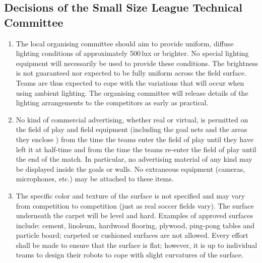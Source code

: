 \subsection*{Decisions of the Small Size League Technical Committee}
\begin{enumerate}
\item
The local organising committee should aim to provide uniform, diffuse lighting
conditions of approximately 500\,lux or brighter. No special lighting equipment
will necessarily be used to provide these conditions. The brightness is not
guaranteed nor expected to be fully uniform across the field surface. Teams are
thus expected to cope with the variations that will occur when using ambient
lighting. The organising committee will release details of the lighting
arrangements to the competitors as early as practical.

\item
No kind of commercial advertising, whether real or virtual, is permitted on the
field of play and field equipment (including the goal nets and the areas they
enclose  ) from the time the teams enter the field of 
play until they have left it
at half-time and from the time the teams re-enter the field of play until the
end of the match. In particular, no advertising material of any kind may be
displayed inside the goals or walls. No extraneous equipment (cameras,
microphones, etc.) may be attached to these items.

\item
The specific color and texture of the surface is not specified and may vary
from competition to competition (just as real soccer fields vary).
The surface underneath the carpet will be level and hard.
Examples of approved surfaces include: cement, linoleum, hardwood flooring,
plywood, ping-pong tables and particle board; carpeted or cushioned surfaces are
not allowed. Every effort shall be made to ensure that the surface is flat;
however, it is up to individual teams to design their robots to cope with slight
curvatures of the surface.
\end{enumerate}